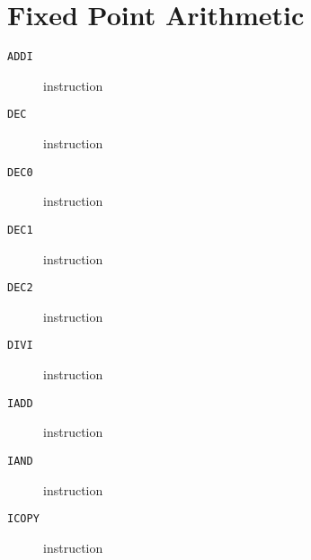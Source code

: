 \section{Fixed Point Arithmetic}
\begin{description}
\item[\texttt{ADDI}] instruction\\

\end{description}
\clearpage
\begin{description}
\item[\texttt{DEC}] instruction\\

\end{description}
\clearpage
\begin{description}
\item[\texttt{DEC0}] instruction\\

\end{description}
\clearpage
\begin{description}
\item[\texttt{DEC1}] instruction\\

\end{description}
\clearpage
\begin{description}
\item[\texttt{DEC2}] instruction\\

\end{description}
\clearpage
\begin{description}
\item[\texttt{DIVI}] instruction\\

\end{description}
\clearpage
\begin{description}
\item[\texttt{IADD}] instruction\\

\end{description}
\clearpage
\begin{description}
\item[\texttt{IAND}] instruction\\

\end{description}
\clearpage
\begin{description}
\item[\texttt{ICOPY}] instruction\\

\end{description}
